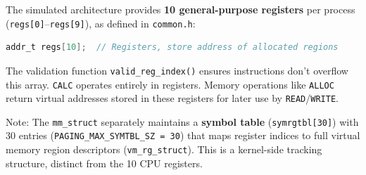 \begin{infobox}
The simulated architecture provides \textbf{10 general-purpose registers} per process (\texttt{regs[0]}--\texttt{regs[9]}), as defined in \texttt{common.h}:
\begin{lstlisting}[language=C]
addr_t regs[10];  // Registers, store address of allocated regions
\end{lstlisting}
The validation function \texttt{valid\_reg\_index()} ensures instructions don't overflow this array. \texttt{CALC} operates entirely in registers. Memory operations like \texttt{ALLOC} return virtual addresses stored in these registers for later use by \texttt{READ}/\texttt{WRITE}.

Note: The \texttt{mm\_struct} separately maintains a \textbf{symbol table} (\texttt{symrgtbl[30]}) with 30 entries (\texttt{PAGING\_MAX\_SYMTBL\_SZ = 30}) that maps register indices to full virtual memory region descriptors (\texttt{vm\_rg\_struct}). This is a kernel-side tracking structure, distinct from the 10 CPU registers.
\end{infobox}
